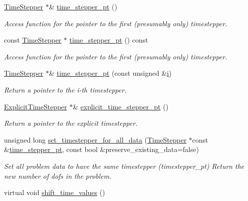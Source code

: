 \begin{DoxyCompactItemize}
\hyperlink{classoomph_1_1TimeStepper}{Time\+Stepper} $\ast$\& \hyperlink{classoomph_1_1Problem_acfdb74e8522fa5d486064998e7223fc6}{time\+\_\+stepper\+\_\+pt} ()
\begin{DoxyCompactList}\small\item\em Access function for the pointer to the first (presumably only) timestepper. \end{DoxyCompactList}\item 
const \hyperlink{classoomph_1_1TimeStepper}{Time\+Stepper} $\ast$ \hyperlink{classoomph_1_1Problem_a3f952a57b5238978250849c04e2fcbdb}{time\+\_\+stepper\+\_\+pt} () const
\begin{DoxyCompactList}\small\item\em Access function for the pointer to the first (presumably only) timestepper. \end{DoxyCompactList}\item 
\hyperlink{classoomph_1_1TimeStepper}{Time\+Stepper} $\ast$\& \hyperlink{classoomph_1_1Problem_a8097472ce262ca85c4b0b4427cbe5d56}{time\+\_\+stepper\+\_\+pt} (const unsigned \&\hyperlink{cfortran_8h_adb50e893b86b3e55e751a42eab3cba82}{i})
\begin{DoxyCompactList}\small\item\em Return a pointer to the i-\/th timestepper. \end{DoxyCompactList}\item 
\hyperlink{classoomph_1_1ExplicitTimeStepper}{Explicit\+Time\+Stepper} $\ast$\& \hyperlink{classoomph_1_1Problem_a6e1f71717b7541246f8bea79dc5ba943}{explicit\+\_\+time\+\_\+stepper\+\_\+pt} ()
\begin{DoxyCompactList}\small\item\em Return a pointer to the explicit timestepper. \end{DoxyCompactList}\item 
unsigned long \hyperlink{classoomph_1_1Problem_a7be66e9917b39eaea90b91389f5a72fb}{set\+\_\+timestepper\+\_\+for\+\_\+all\+\_\+data} (\hyperlink{classoomph_1_1TimeStepper}{Time\+Stepper} $\ast$const \&\hyperlink{classoomph_1_1Problem_acfdb74e8522fa5d486064998e7223fc6}{time\+\_\+stepper\+\_\+pt}, const bool \&preserve\+\_\+existing\+\_\+data=false)
\begin{DoxyCompactList}\small\item\em Set all problem data to have the same timestepper (timestepper\+\_\+pt) Return the new number of dofs in the problem. \end{DoxyCompactList}\item 
virtual void \hyperlink{classoomph_1_1Problem_aab27bdd1968e57cb3dffe78c1d63f762}{shift\+\_\+time\+\_\+values} ()

\end{DoxyCompactItemize}
